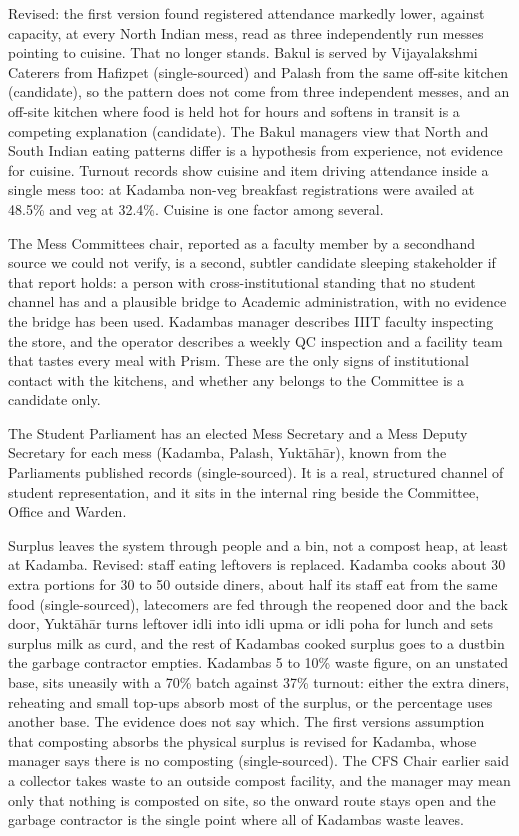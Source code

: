 \documentclass[
  10pt,
  table]{article}
\begin{document}
Revised: the first version found registered attendance markedly lower, against capacity, at every North Indian mess, read as three independently run messes pointing to cuisine. That no longer stands. Bakul is served by Vijayalakshmi Caterers from Hafizpet (single-sourced) and Palash from the same off-site kitchen (candidate), so the pattern does not come from three independent messes, and an off-site kitchen where food is held hot for hours and softens in transit is a competing explanation (candidate). The Bakul manager\textquotesingle s view that North and South Indian eating patterns differ is a hypothesis from experience, not evidence for cuisine. Turnout records show cuisine and item driving attendance inside a single mess too: at Kadamba non-veg breakfast registrations were availed at 48.5\% and veg at 32.4\%. Cuisine is one factor among several.

The Mess Committee\textquotesingle s chair, reported as a faculty member by a secondhand source we could not verify, is a second, subtler candidate sleeping stakeholder if that report holds: a person with cross-institutional standing that no student channel has and a plausible bridge to Academic administration, with no evidence the bridge has been used. Kadamba\textquotesingle s manager describes IIIT faculty inspecting the store, and the operator describes a weekly QC inspection and a facility team that tastes every meal with Prism. These are the only signs of institutional contact with the kitchens, and whether any belongs to the Committee is a candidate only.

The Student Parliament has an elected Mess Secretary and a Mess Deputy Secretary for each mess (Kadamba, Palash, Yuktāhār), known from the Parliament\textquotesingle s published records (single-sourced). It is a real, structured channel of student representation, and it sits in the internal ring beside the Committee, Office and Warden.

Surplus leaves the system through people and a bin, not a compost heap, at least at Kadamba. Revised: staff eating leftovers is replaced. Kadamba cooks about 30 extra portions for 30 to 50 outside diners, about half its staff eat from the same food (single-sourced), latecomers are fed through the reopened door and the back door, Yuktāhār turns leftover idli into idli upma or idli poha for lunch and sets surplus milk as curd, and the rest of Kadamba\textquotesingle s cooked surplus goes to a dustbin the garbage contractor empties. Kadamba\textquotesingle s 5 to 10\% waste figure, on an unstated base, sits uneasily with a 70\% batch against 37\% turnout: either the extra diners, reheating and small top-ups absorb most of the surplus, or the percentage uses another base. The evidence does not say which. The first version\textquotesingle s assumption that composting absorbs the physical surplus is revised for Kadamba, whose manager says there is no composting (single-sourced). The CFS Chair earlier said a collector takes waste to an outside compost facility, and the manager may mean only that nothing is composted on site, so the onward route stays open and the garbage contractor is the single point where all of Kadamba\textquotesingle s waste leaves.
\end{document}
